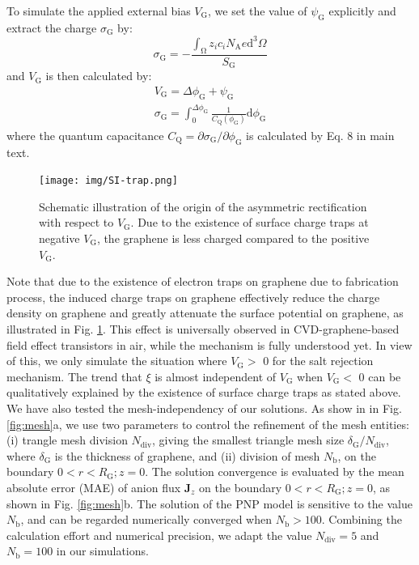 \documentclass[manuscript=suppinfo,email=true, hyperref=true, keywords=false]{achemso}
\newcommand{\Fig}{Fig.}
\begin{document}
To simulate the applied external bias $V_{\mathrm{G}}$, we set the
value of $\psi_{\mathrm{G}}$ explicitly and extract the charge
$\sigma_{\mathrm{G}}$ by:
\begin{equation}
  \label{eq:sigma-G}
  \sigma_{\mathrm{G}} = - {\displaystyle \frac{\int_{\mathrm{\Omega}} z_{i} c_{i} N_{\mathrm{A}} e \mathrm{d}^{3} \Omega}{S_{\mathrm{G}}}}
\end{equation}
and $V_{\mathrm{G}}$ is then calculated by:
\begin{eqnarray}
  \label{eq:VG}
  V_{\mathrm{G}} = \Delta \phi_{\mathrm{G}} + \psi_{\mathrm{G}}\\
  \sigma_{\mathrm{G}} = \int_{0}^{\Delta \phi_{\mathrm{G}}} \frac{1}{C_{\mathrm{Q}}(\phi_{\mathrm{G}})} \mathrm{d} \phi_{\mathrm{G}}
\end{eqnarray}
where the quantum capacitance
$C_{\mathrm{Q}}=\partial \sigma_{\mathrm{G}}/\partial
\phi_{\mathrm{G}}$ is calculated by Eq. 8 in main text.

\begin{figure}[htbp]
  \centering
  \texttt{[image: img/SI-trap.png]}
  \caption{Schematic illustration of the origin of the asymmetric
    rectification with respect to $V_{\mathrm{G}}$. Due to the
    existence of surface charge traps at negative $V_{\mathrm{G}}$,
    the graphene is less charged compared to the positive
    $V_{\mathrm{G}}$.}
  \label{fig:trap}
\end{figure}

Note that due to the existence of electron traps on graphene due to
fabrication process, the induced charge traps on graphene effectively
reduce the charge density on graphene and greatly attenuate the
surface potential on graphene, as illustrated in \Fig
\ref{fig:trap}. This effect is universally observed in
CVD-graphene-based field effect transistors in air, while the
mechanism is fully understood yet. In view of this, we only simulate
the situation where $V_{\mathrm{G}}>$ 0 for the salt rejection
mechanism. The trend that $\xi$ is almost independent of
$V_{\mathrm{G}}$ when $V_{\mathrm{G}}<$ 0 can be qualitatively
explained by the existence of surface charge traps as stated above.
We have also tested the mesh-independency of our solutions. As show in
in \Fig{} \ref{fig:mesh}a, we use two parameters to control the
refinement of the mesh entities: (i) trangle mesh division
$N_{\mathrm{div}}$, giving the smallest triangle mesh size
$\delta_{\mathrm{G}} / N_{\mathrm{div}}$, where $\delta_{\mathrm{G}}$
is the thickness of graphene, and (ii) division of mesh
$N_{\mathrm{b}}$, on the boundary $0<r<R_{\mathrm{G}};z=0$. The
solution convergence is evaluated by the mean absolute error (MAE) of
anion flux $\boldsymbol{J}_{z}$ on the boundary
$0<r<R_{\mathrm{G}};z=0$, as shown in \Fig{}
\ref{fig:mesh}b. The solution of the PNP model is sensitive to the
value $N_{\mathrm{b}}$, and can be regarded numerically converged when
$N_{\mathrm{b}}>100$. Combining the calculation effort and numerical
precision, we adapt the value $N_{\mathrm{div}}=5$ and
$N_{\mathrm{b}}=100$ in our simulations.
\end{document}
